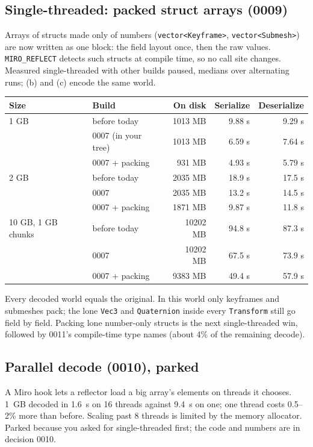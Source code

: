 \documentclass[11pt,a4paper]{article}
\newcommand{\code}[1]{\texttt{#1}}
\begin{document}
\subsection{Single-threaded: packed struct arrays (0009)}

Arrays of structs made only of numbers (\code{vector<Keyframe>}, \code{vector<Submesh>}) are now written as one block: the field layout once, then the raw values. \code{MIRO\_REFLECT} detects such structs at compile time, so no call site changes. Measured single-threaded with other builds paused, medians over alternating runs; (b) and (c) encode the same world.

\begin{tabularx}{\textwidth}{@{}X l r r r@{}}
\toprule
Size & Build & On disk & Serialize & Deserialize \\
\midrule
1 GB & before today & 1013 MB & 9.88 s & 9.29 s \\
 & 0007 (in your tree) & 1013 MB & 6.59 s & 7.64 s \\
 & 0007 + packing & 931 MB & 4.93 s & 5.79 s \\
2 GB & before today & 2035 MB & 18.9 s & 17.5 s \\
 & 0007 & 2035 MB & 13.2 s & 14.5 s \\
 & 0007 + packing & 1871 MB & 9.87 s & 11.8 s \\
10 GB, 1 GB chunks & before today & 10202 MB & 94.8 s & 87.3 s \\
 & 0007 & 10202 MB & 67.5 s & 73.9 s \\
 & 0007 + packing & 9383 MB & 49.4 s & 57.9 s \\
\bottomrule
\end{tabularx}

Every decoded world equals the original. In this world only keyframes and submeshes pack; the lone \code{Vec3} and \code{Quaternion} inside every \code{Transform} still go field by field. Packing lone number-only structs is the next single-threaded win, followed by 0011's compile-time type names (about 4\% of the remaining decode).

\subsection{Parallel decode (0010), parked}

A Miro hook lets a reflector load a big array's elements on threads it chooses. 1~GB decoded in 1.6~s on 16 threads against 9.4~s on one; one thread costs 0.5--2\% more than before. Scaling past 8 threads is limited by the memory allocator. Parked because you asked for single-threaded first; the code and numbers are in decision 0010.
\end{document}
